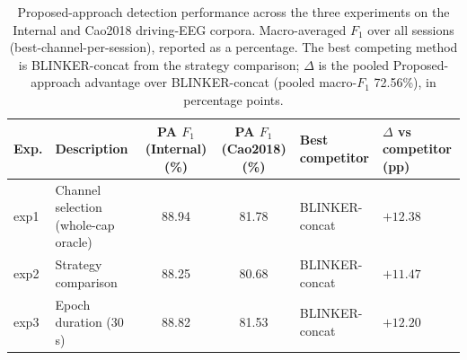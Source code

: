 \begin{table}[ht]
  \centering
  \caption{Proposed-approach detection performance across the three experiments on the Internal and Cao2018 driving-EEG corpora. Macro-averaged $F_1$ over all sessions (best-channel-per-session), reported as a percentage. The best competing method is BLINKER-concat from the strategy comparison; $\Delta$ is the pooled Proposed-approach advantage over BLINKER-concat (pooled macro-$F_1$ 72.56\%), in percentage points.}
  \label{tab:exp_summary}
  \begin{tabular}{llccll}
    \toprule
    Exp. & Description & PA $F_1$ (Internal) (\%) & PA $F_1$ (Cao2018) (\%) & Best competitor & $\Delta$ vs competitor (pp) \\
    \midrule
    exp1 & Channel selection (whole-cap oracle) & 88.94 & 81.78 & BLINKER-concat & $+12.38$ \\
    exp2 & Strategy comparison & 88.25 & 80.68 & BLINKER-concat & $+11.47$ \\
    exp3 & Epoch duration (30\,s) & 88.82 & 81.53 & BLINKER-concat & $+12.20$ \\
    \bottomrule
  \end{tabular}
\end{table}

